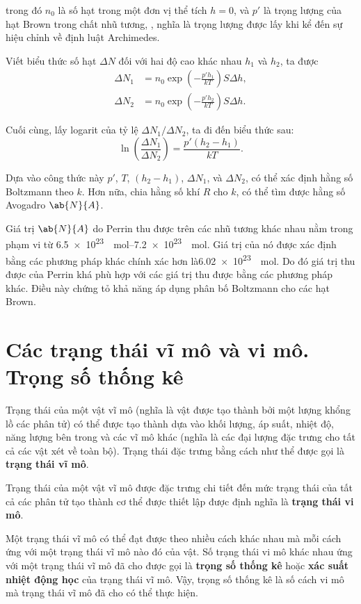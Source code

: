 \noindent
trong đó $n_0$ là số hạt trong một đơn vị thể tích $h=0$, và $p'$ là trọng lượng của hạt Brown trong chất nhũ tương, \ie, nghĩa là trọng lượng được lấy khi kể đến sự hiệu chỉnh về định luật Archimedes.

Viết biểu thức số hạt $\Delta N$ đối với hai độ cao khác nhau $h_1$ và $h_2$, ta được
\begin{align*}
	\Delta N_1 &= n_0 \exp\left(-\frac{p' h_1}{kT}\right) S \Delta h,\\
	\Delta N_2 &= n_0 \exp\left(-\frac{p' h_2}{kT}\right) S \Delta h.
\end{align*}

\noindent
Cuối cùng, lấy logarit của tỷ lệ $\Delta N_1/\Delta N_2$, ta đi đến biểu thức sau:
\begin{equation}\label{eq:11_83}
	\ln\left(\frac{\Delta N_1}{\Delta N_2}\right) = \frac{p' (h_2 - h_1)}{kT}.
\end{equation}

Dựa vào công thức này $p'$, $T$, $(h_2-h_1)$, $\Delta N_1$, và $\Delta N_2$,  có thể xác định hằng số Boltzmann theo $k$. Hơn nữa, chia hằng số khí $R$ cho $k$, có thể tìm được hằng số Avogadro $\ab{N}{A}$.

Giá trị $\ab{N}{A}$ do Perrin thu được trên các nhũ tương khác nhau nằm trong phạm vi từ \SIrange{6.5e23}{7.2e23}{\per\mole}. Giá trị của nó được xác định bằng các phương pháp khác chính xác hơn là\SI{6.02e23}{\per\mole}. Do đó giá trị thu được của Perrin khá phù hợp với các giá trị thu được bằng các phương pháp khác. Điều này chứng tỏ khả năng áp dụng phân bố Boltzmann cho các hạt Brown.

\section{Các trạng thái vĩ mô và vi mô. Trọng số thống kê}\label{sec:11_10}

Trạng thái của một vật vĩ mô (nghĩa là vật được tạo thành bởi một lượng khổng lồ các phân tử) có thể được tạo thành dựa vào khối lượng, áp suất, nhiệt độ, năng lượng bên trong và các vĩ mô khác (nghĩa là các đại lượng đặc trưng cho tất cả các vật xét về toàn bộ). Trạng thái đặc trưng bằng cách như thể được gọi là  \textbf{trạng thái vĩ mô}.

Trạng thái của một vật vĩ mô được đặc trưng chi tiết đến mức trạng thái của tất cả các phân tử tạo thành cơ thể được thiết lập được định nghĩa là \textbf{trạng thái vi mô}.

Một trạng thái vĩ mô có thể đạt được theo nhiều cách khác nhau mà mỗi cách ứng với một trạng thái vĩ mô nào đó của vật. Số trạng thái vi mô khác nhau ứng với một trạng thái vĩ mô đã cho được gọi là \textbf{trọng số thống kê} hoặc \textbf{xác suất nhiệt động học} của trạng thái vĩ mô. Vậy, trọng số thống kê là số cách vi mô mà trạng thái vĩ mô đã cho có thể thực hiện.

